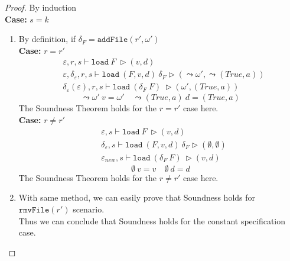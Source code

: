 \documentclass[10pt,twoside,a4paper]{article}
\theoremstyle{theorem}
\theoremstyle{lemma}
\theoremstyle{property}
\theoremstyle{definition}
\theoremstyle{assumption}
\def\newenv{\delta_\varepsilon(\varepsilon)}
\begin{document}
\begin{proof}
	By induction\\
	\textbf{Case: } $s = k$\\
	\begin{enumerate}
	\begin{comment}
	\item
	By definition, if $\varepsilon_{old}(r) \not= \varepsilon_{new}(r)$,
	\begin{align*}
			& \varepsilon, s \vdash \mathtt{load}~ F~ \rhd (v,d)\\
			& \delta_\varepsilon, s \vdash \mathtt{load}~ (F,v,d)~ \delta_F \rhd (\leadsto \omega', \leadsto (True, a))\\
			& \varepsilon_{new}, s \vdash \mathtt{load}~ (\delta_F~F)~ \rhd (\omega', (True, a))
	\end{align*}
	\begin{displaymath}
		\leadsto \omega' ~v = \omega' \quad \leadsto (True, a) ~d = (True, a)
	\end{displaymath}
	The Soundness Theorem holds for the $\varepsilon_{old}(r) \not= \varepsilon_{new}(r)$ case here. \\
	\end{comment}
	\item
	By definition, if $\delta_F = \mathtt{addFile}(r',\omega')$ \\
	\textbf{Case: } $r = r'$
	\begin{align*}
			& \varepsilon, r, s \vdash \mathtt{load}~ F~ \rhd (v,d)\\
			& \varepsilon, \delta_\varepsilon, r, s \vdash \mathtt{load}~ (F,v,d)~ \delta_F \rhd (\leadsto \omega', \leadsto (True, a))\\
			& \newenv, r, s \vdash \mathtt{load}~ (\delta_F~F)~ \rhd (\omega', (True, a))
	\end{align*}
	\begin{displaymath}
		\leadsto \omega' ~v = \omega' \quad \leadsto (True, a) ~d = (True, a)
	\end{displaymath}
	The Soundness Theorem holds for the $r = r'$ case here. \\
	\textbf{Case: } $r \not= r'$
	\begin{align*}
			& \varepsilon, s \vdash \mathtt{load}~ F~ \rhd (v,d)\\
			& \delta_\varepsilon, s \vdash \mathtt{load}~ (F,v,d)~ \delta_F \rhd (\emptyset, \emptyset)\\
			& \varepsilon_{new}, s \vdash \mathtt{load}~ (\delta_F~F)~ \rhd (v,d)
	\end{align*}
	\begin{displaymath}
		\emptyset ~v = v \quad \emptyset ~d = d
	\end{displaymath}
	The Soundness Theorem holds for the $r \not= r'$ case here.\\
	\item
	With same method, we can easily prove that Soundness holds for $\mathtt{rmvFile}(r')$ scenario. \\
	Thus we can conclude that Soundness holds for the constant specification case.
	\end{enumerate}
	

\end{proof}
\end{document}

